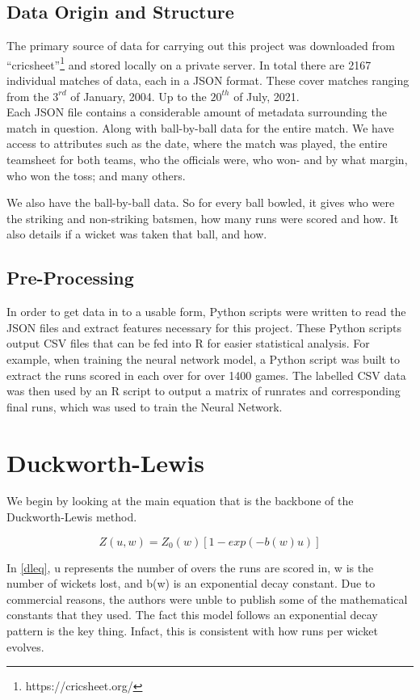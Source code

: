 \documentclass[11pt]{amsart}
\begin{document}
\subsection{Data Origin and Structure}
The primary source of data for carrying out this project was downloaded from ``cricsheet''\footnote{https://cricsheet.org/}
and stored locally on a private server. In total there are 2167 individual matches of data, each in a JSON format.
These cover matches ranging from the $3^{rd}$ of January, 2004. Up to the $20^{th}$ of July, 2021. \\ 

Each JSON file contains a considerable amount of metadata surrounding the match in question. Along with 
ball-by-ball data for the entire match. We have access to attributes such as the date, where the match was played,
the entire teamsheet for both teams, who the officials were, who won- and by what margin, who won the toss; and many others.

We also have the ball-by-ball data. So for every ball bowled, it gives who were the striking and non-striking batsmen, how many runs
were scored and how. It also details if a wicket was taken that ball, and how.

\subsection{Pre-Processing}
In order to get data in to a usable form, Python scripts were written to read the JSON files and extract features necessary for this project.
These Python scripts output CSV files that can be fed into R for easier statistical analysis. For example, when training the neural network model,
a Python script was built to extract the runs scored in each over for over 1400 games. The labelled CSV data was then used by an R script to 
output a matrix of runrates and corresponding final runs, which was used to train the Neural Network.


\section{Duckworth-Lewis}
We begin by looking at the main equation that is the backbone of the Duckworth-Lewis method.

\begin{equation}
    \label{dleq}
    Z(u,w) = Z_0(w)[1-exp(-b(w)u)]
\end{equation}

In \ref{dleq}, u represents the number of overs the runs are scored in, w is the number of wickets lost, and b(w) is an exponential decay constant.
Due to commercial reasons, the authors were unble to publish some of the mathematical constants that they used. The fact this model follows an exponential decay 
pattern is the key thing. Infact, this is consistent with how runs per wicket evolves. \\
\end{document}
